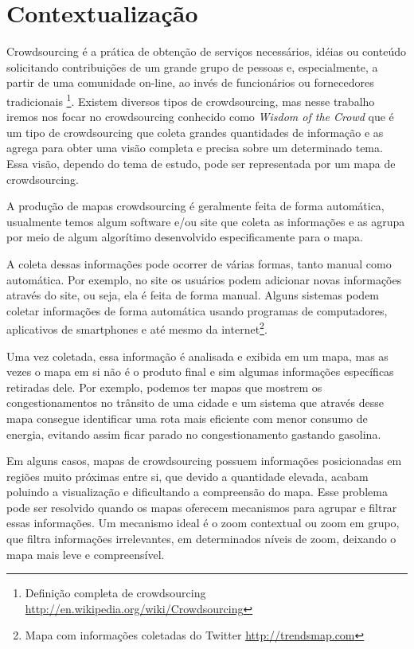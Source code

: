 \section{Contextualização}
Crowdsourcing é a prática de obtenção de serviços necessários, idéias ou conteúdo solicitando contribuições de um grande grupo de pessoas e, especialmente, a partir de uma comunidade on-line, ao invés de funcionários ou fornecedores tradicionais \footnote{\label{wiki-crowd} Definição completa de crowdsourcing \url{ http://en.wikipedia.org/wiki/Crowdsourcing}}.
Existem diversos tipos de crowdsourcing, mas nesse trabalho iremos nos focar no crowdsourcing conhecido como \emph{Wisdom of the Crowd} que é um tipo de crowdsourcing que coleta grandes quantidades de informação e as agrega para obter uma visão completa e precisa sobre um determinado tema. Essa visão, dependo do tema de estudo, pode ser representada por um mapa de crowdsourcing.

A produção de mapas crowdsourcing é geralmente feita de forma automática, usualmente temos algum software e/ou site que coleta as informações e as agrupa por meio de algum algorítimo desenvolvido especificamente para o mapa.

A coleta dessas informações pode ocorrer de várias formas, tanto manual como automática. Por exemplo, no site  os usuários podem adicionar novas informações através do site, ou seja, ela é feita de forma manual. Alguns sistemas podem coletar informações de forma automática usando programas de computadores, aplicativos de smartphones \cite{thiagarajan_cooperative_2010}  e até mesmo da internet\footnote{ Mapa com informações coletadas do Twitter \url{http://trendsmap.com}}.

Uma vez coletada, essa informação é analisada e exibida em um mapa, mas as vezes o mapa em si não é o produto final e sim algumas informações específicas retiradas dele. Por exemplo, podemos ter mapas que mostrem os congestionamentos no trânsito de uma cidade e um sistema \cite{thiagarajan_vtrack:_2009} que através desse mapa consegue identificar  uma rota mais eficiente com menor consumo de energia, evitando assim ficar parado no congestionamento gastando gasolina.

Em alguns casos, mapas de crowdsourcing possuem informações posicionadas em regiões muito próximas entre si, que devido a quantidade elevada, acabam poluindo a visualização e dificultando a compreensão do mapa. Esse problema pode ser resolvido quando os mapas oferecem mecanismos para agrupar e filtrar essas informações. Um mecanismo ideal é o zoom contextual ou zoom em grupo, que filtra informações irrelevantes, em determinados níveis de zoom, deixando o mapa mais leve e compreensível.

